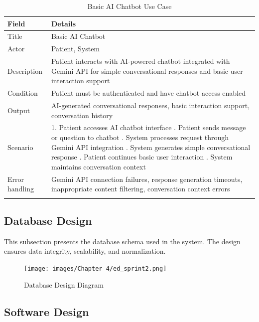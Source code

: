 \begin{longtable}{|p{3cm}|p{12cm}|}
\hline
\textbf{Field} & \textbf{Details} \\
\hline
Title & Basic AI Chatbot \\
\hline
Actor & Patient, System \\
\hline
Description & Patient interacts with AI-powered chatbot integrated with Gemini API for simple conversational responses and basic user interaction support \\
\hline
Condition & Patient must be authenticated and have chatbot access enabled \\
\hline
Output & AI-generated conversational responses, basic interaction support, conversation history \\
\hline
Scenario & 1. Patient accesses AI chatbot interface \newline 2. Patient sends message or question to chatbot \newline 3. System processes request through Gemini API integration \newline 4. System generates simple conversational response \newline 5. Patient continues basic user interaction \newline 6. System maintains conversation context \\
\hline
Error handling & Gemini API connection failures, response generation timeouts, inappropriate content filtering, conversation context errors \\
\hline
\caption{Basic AI Chatbot Use Case}
\end{longtable}
\newpage

\subsection{Database Design}

This subsection presents the database schema used in the system. The design ensures data integrity, scalability, and normalization.
 
\vfill
\begin{figure}[H]
    \centering
    \texttt{[image: images/Chapter 4/ed\_sprint2.png]}
    \caption{Database Design Diagram}
    \label{fig:database-design}
\end{figure}



\vfill
\newpage

\subsection{Software Design}

